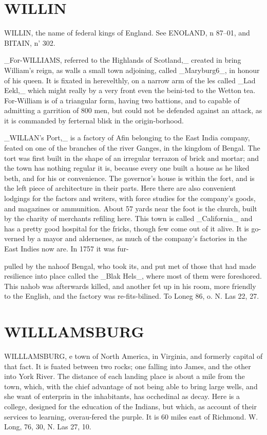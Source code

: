\documentclass{article}
\begin{document}
\section*{WILLIN}
WILLIN, the name of federal kings of England. See ENOLAND, n 87--01, and BITAIN, n' 302.

\_For-WILLIAMS, referred to the Highlands of Scotland,\_ created in bring William's reign, as walls a small town adjoining, called \_Maryburg6\_, in honour of his queen. It is fixated in herevelthly, on a narrow arm of the les called \_Lad Eekl,\_ which might really by a very front even the beini-ted to the Wetton tea. For-William is of a triangular form, having two battions, and to capable of admitting a garrition of 800 men, but could not be defended against an attack, as it is commanded by ferternal blisk in the origin-borhood.

\_WILLAN’s Port,\_ is a factory of Afin belonging to the East India company, feated on one of the branches of the river Ganges, in the kingdom of Bengal. The tort was first built in the shape of an irregular terrazon of brick and mortar; and the town has nothing regular it is, because every one built a house as he liked beth, and for his or convenience. The governor's house is within the fort, and is the left piece of architecture in their parts. Here there are also convenient lodgings for the factors and writers, with force studies for the company's goods, and magazines or ammunition. About 57 yards near the foot is the church, built by the charity of merchants refiling here. This town is called \_California\_ and has a pretty good hospital for the fricks, though few come out of it alive. It is go-verned by a mayor and aldernenes, as much of the company's factories in the East Indies now are. In 1757 it was fur-

pulled by the nahoof Bengal, who took its, and put met of those that had made resilience into place called the \_Blak Hels\_, where most of them were foreshored. This nahob was afterwards killed, and another fet up in his room, more friendly to the English, and the factory was re-fits-bilined. To Loneg 86, o. N. Las 22, 27.

\section*{WILLLAMSBURG}
WILLLAMSBURG, e town of North America, in Virginia, and formerly capital of that fact. It is fuated between two rocks; one falling into James, and the other into York River. The distance of each landing place is about a mile from the town, which, with the chief advantage of not being able to bring large wells, and she want of enterprin in the inhabitants, has occhedinal as decay. Here is a college, designed for the education of the Indians, but which, as account of their services to learning, overau-fered the purple. It is 60 miles east of Richmond. W. Long, 76, 30, N. Las 27, 10.
\end{document}

